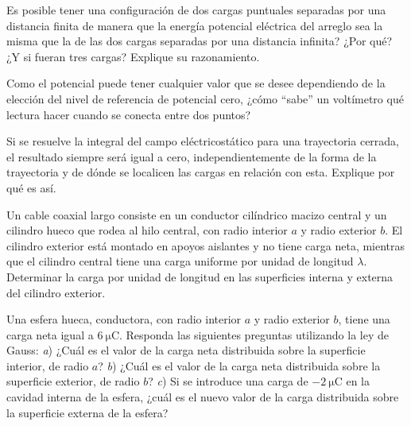 %
\begin{Exercise}
    Es posible tener una configuración de dos cargas puntuales separadas por una distancia finita de manera que la energía potencial eléctrica del arreglo sea la misma que la de las dos cargas separadas por una distancia infinita? ¿Por qué? ¿Y si fueran tres cargas? Explique su razonamiento.
\end{Exercise}
%
\begin{Exercise}
    Como el potencial puede tener cualquier valor que se desee dependiendo de la elección del nivel de referencia de potencial cero, ¿cómo “sabe” un voltímetro qué lectura hacer cuando se conecta entre dos puntos?
\end{Exercise}
%
\begin{Exercise}
    Si se resuelve la integral del campo eléctricostático para una trayectoria cerrada, el resultado siempre será igual a cero, independientemente de la forma de la trayectoria y de dónde se localicen las cargas en relación con esta. Explique por qué es así.
\end{Exercise}
%
\begin{Exercise}
	Un cable coaxial largo consiste en un conductor cilíndrico macizo central y un cilindro hueco que rodea al hilo central, con radio interior $a$ y radio exterior $b$. El cilindro exterior está montado en apoyos aislantes y no tiene carga neta, mientras que el cilindro central tiene una carga uniforme por unidad de longitud $\lambda$. Determinar la carga por unidad de longitud en las superficies interna y externa del cilindro exterior.
\end{Exercise}
%
\begin{Exercise}
	Una esfera hueca, conductora, con radio interior $a$ y radio exterior $b$, tiene una carga neta igual a $\SI{6}{\micro\coulomb}$. Responda las siguientes preguntas utilizando la ley de Gauss: \textit{a}) ¿Cuál es el valor de la carga neta distribuida sobre la superficie interior, de radio $a$? \textit{b}) ¿Cuál es el valor de la carga neta distribuida sobre la superficie exterior, de radio $b$? \textit{c}) Si se introduce una carga de $\SI{-2}{\micro\coulomb}$ en la cavidad interna de la esfera, ¿cuál es el nuevo valor de la carga distribuida sobre la superficie externa de la esfera?
\end{Exercise}
